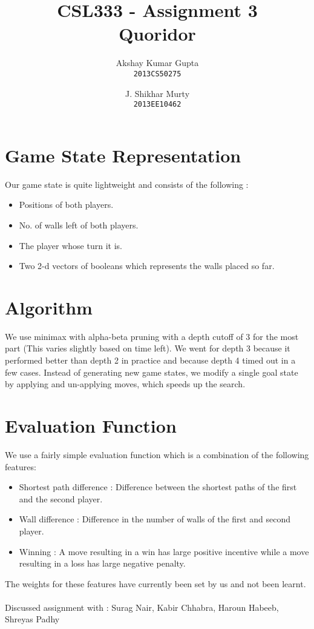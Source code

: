 \documentclass[]{article}
\begin{document}
\title{CSL333 - Assignment 3\\ Quoridor}
\author{Akshay Kumar Gupta\\\texttt{2013CS50275} \and  J. Shikhar Murty\\\texttt{2013EE10462}}
\date{}
\maketitle
\section{Game State Representation}
Our game state is quite lightweight and consists of the following :
\begin{itemize}
\item Positions of both players.
\item No. of walls left of both players.
\item The player whose turn it is.
\item Two 2-d vectors of booleans which represents the walls placed so far.
\end{itemize}
\section{Algorithm}
We use minimax with alpha-beta pruning with a depth cutoff of 3 for the most part (This varies slightly based on time left). We went for depth 3 because it performed better than depth 2 in practice and because depth 4 timed out in a few cases. Instead of generating new game states, we modify a single goal state by applying and un-applying moves, which speeds up the search.
\section{Evaluation Function}
We use a fairly simple evaluation function which is a combination of the following features:
\begin{itemize}
\item Shortest path difference : Difference between the shortest paths of the first and the second player.
\item Wall difference : Difference in the number of walls of the first and second player.
\item Winning : A move resulting in a win has large positive incentive while a move resulting in a loss has large negative penalty.
\end{itemize}
The weights for these features have currently been set by us and not been learnt.
\\
\\
Discussed assignment with : Surag Nair, Kabir Chhabra, Haroun Habeeb, Shreyas Padhy
\end{document}
